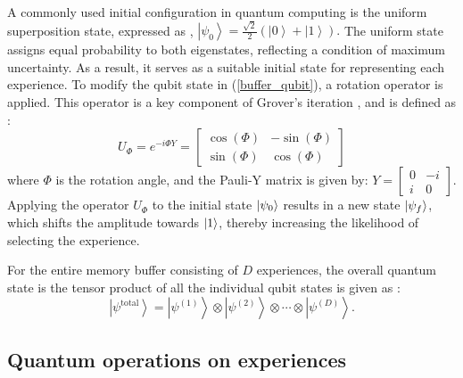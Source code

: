 \documentclass[journal]{IEEEtran}
\begin{document}
A commonly used initial configuration in quantum computing is the uniform superposition state, expressed as \cite{9357477},
\( \left |{\psi _{0}}\right \rangle =\frac {\sqrt {2}}{2}\left ({\left |{0}\right \rangle +\left |{1}\right \rangle }\right).\)
The uniform state assigns equal probability to both eigenstates, reflecting a condition of maximum uncertainty. As a result, it serves as a suitable initial state for representing each experience. To modify the qubit state in (\ref{buffer_qubit}), a rotation operator is applied. This operator is a key component of Grover's iteration \cite{dong2008quantum}\cite{grover1997quantum}, and is defined as \cite{9357477}:
\begin{equation}
    U_{\Phi} = e^{-i \Phi Y} = 
    \begin{bmatrix}
        \cos(\Phi) & -\sin(\Phi) \\
        \sin(\Phi) & \cos(\Phi)
    \end{bmatrix}
\end{equation}
where $\Phi$ is the rotation angle, and the Pauli-Y matrix is given by:
\( Y = \begin{bmatrix}
0 & -i \\
i & 0
\end{bmatrix}.
\)
Applying the operator $U_{\Phi}$ to the initial state $\ket{\psi_0}$ results in a new state $\ket{\psi_f}$, which shifts the amplitude towards $\ket{1}$, thereby increasing the likelihood of selecting the experience.

For the entire memory buffer consisting of $D$ experiences, the overall quantum state is the tensor product of all the individual qubit states is given as \cite{9357477}:
\begin{equation}
\left |{\psi^{\text{total}}}\right \rangle = \left |{\psi^{(1)}}\right \rangle \otimes \left |{\psi^{(2)}}\right \rangle \otimes \cdots \otimes \left |{\psi^{(D)}}\right \rangle.
\end{equation}


\subsection{Quantum operations on experiences}
\end{document}
